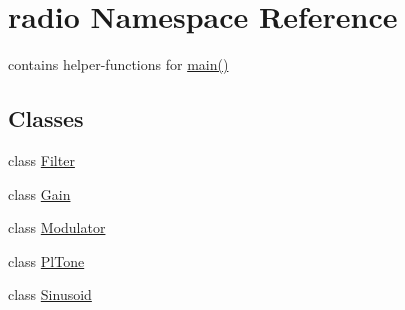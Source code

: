\hypertarget{namespaceradio}{\section{radio Namespace Reference}
\label{namespaceradio}
}


contains helper-\/functions for \hyperlink{alsa__test_8cpp_ae66f6b31b5ad750f1fe042a706a4e3d4}{main()}  


\subsection*{Classes}
\begin{DoxyCompactItemize}
\item 
class \hyperlink{classradio_1_1Filter}{Filter}
\item 
class \hyperlink{classradio_1_1Gain}{Gain}
\item 
class \hyperlink{classradio_1_1Modulator}{Modulator}
\item 
class \hyperlink{classradio_1_1PlTone}{Pl\+Tone}
\item 
class \hyperlink{classradio_1_1Sinusoid}{Sinusoid}
\end{DoxyCompactItemize}
